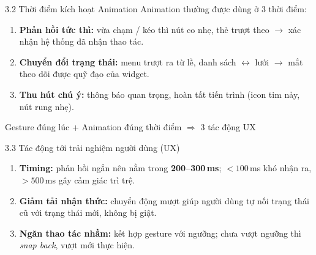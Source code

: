 \documentclass[aspectratio=169,10pt]{beamer}
\begin{document}
\begin{frame}{3.2 Thời điểm kích hoạt Animation}
  Animation thường được dùng ở 3 thời điểm:

  \vspace{0.3cm}
  \begin{enumerate}
    \item \textbf{Phản hồi tức thì:} vừa chạm / kéo thì nút co nhẹ, thẻ trượt theo
          $\rightarrow$ xác nhận hệ thống đã nhận thao tác.
    \vspace{0.2cm}
    \item \textbf{Chuyển đổi trạng thái:} menu trượt ra từ lề, danh sách $\leftrightarrow$ lưới
          $\rightarrow$ mắt theo dõi được quỹ đạo của widget.
    \vspace{0.2cm}
    \item \textbf{Thu hút chú ý:} thông báo quan trọng, hoàn tất tiến trình
          (icon tim nảy, nút rung nhẹ).
  \end{enumerate}

  \vspace{0.4cm}
  \begin{center}
    Gesture đúng lúc + Animation đúng thời điểm $\Rightarrow$ 3 tác động UX
  \end{center}
\end{frame}

\begin{frame}{3.3 Tác động tới trải nghiệm người dùng (UX)}
  \begin{enumerate}
    \item \textbf{Timing:} phản hồi ngắn nên nằm trong \textbf{200--300\,ms};
          $<100$\,ms khó nhận ra, $>500$\,ms gây cảm giác trì trệ.
    \vspace{0.2cm}
    \item \textbf{Giảm tải nhận thức:} chuyển động mượt giúp người dùng tự nối
          trạng thái cũ với trạng thái mới, không bị giật.
    \vspace{0.2cm}
    \item \textbf{Ngăn thao tác nhầm:} kết hợp gesture với ngưỡng;
          chưa vượt ngưỡng thì \textit{snap back}, vượt mới thực hiện.
  \end{enumerate}
\end{frame}
\end{document}
